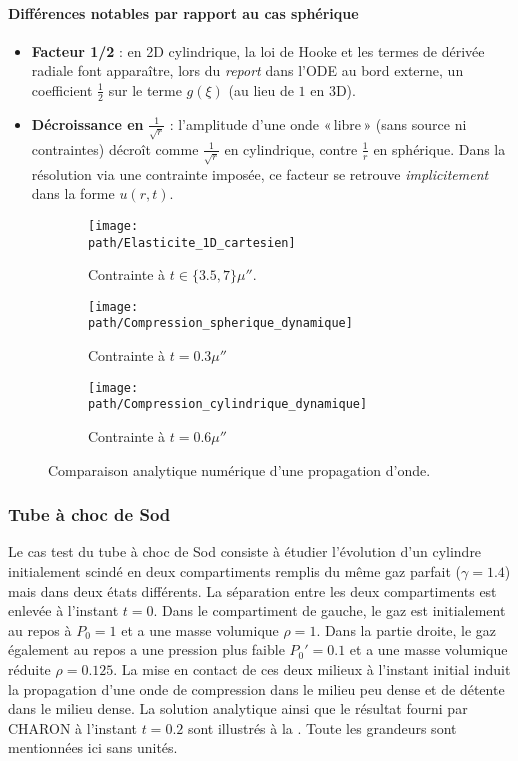 \documentclass[10pt]{book}
\def\path{./fig}
\begin{document}
\paragraph{ Différences notables par rapport au cas sphérique}
\begin{itemize}
\item \textbf{Facteur 1/2} : en 2D cylindrique, la loi de Hooke et les termes de dérivée radiale font apparaître, lors du \emph{report} dans l’ODE au bord externe, un coefficient $\tfrac12$ sur le terme $g(\xi)$ (au lieu de $1$ en 3D). 
\item \textbf{Décroissance en } $\tfrac{1}{\sqrt{r}}$ : l’amplitude d’une onde «\,libre\,» (sans source ni contraintes) décroît comme $\tfrac{1}{\sqrt{r}}$ en cylindrique, contre $\tfrac{1}{r}$ en sphérique. Dans la résolution via une contrainte imposée, ce facteur se retrouve \emph{implicitement} dans la forme $u(r,t)$.
\end{itemize}
\begin{figure}
\begin{subfigure}[b]{0.32\textwidth}
\centering \texttt{[image: \\path/Elasticite\_1D\_cartesien]}
\caption{Contrainte à $t\in\{3.5,7\}\mu\second$.}
\label{fig:Elasticite_1D_cartesien}
\end{subfigure}
\begin{subfigure}[b]{0.32\textwidth}
\centering \texttt{[image: \\path/Compression\_spherique\_dynamique]}
\caption{Contrainte à $t=0.3\mu\second$}
\label{fig:Compression_spherique_dynamique}
\end{subfigure}
\begin{subfigure}[b]{0.32\textwidth}
\centering \texttt{[image: \\path/Compression\_cylindrique\_dynamique]}
\caption{Contrainte à $t=0.6\mu\second$}
\label{fig:Compression_cylindrique_dynamique}
\end{subfigure}
\caption{Comparaison analytique numérique d'une propagation d'onde.}
\label{fig:propagation_dynamique}
\end{figure}
\subsubsection{Tube à choc de Sod}
Le cas test du tube à choc de Sod \cite{sod1978survey} consiste à étudier l'évolution d'un cylindre initialement scindé en deux compartiments remplis du même gaz parfait ($\gamma=1.4$) mais dans deux états différents. La séparation entre les deux compartiments est enlevée à l'instant $t=0$. Dans le compartiment de gauche, le gaz est initialement au repos à $P_{0}=1$ et a une masse volumique $\rho=1$. Dans la partie droite, le gaz également au repos a une pression plus faible $P_{0}'=0.1$ et a une masse volumique réduite $\rho=0.125$. La mise en contact de ces deux milieux à l'instant initial induit la propagation d'une onde de compression dans le milieu peu dense et de détente dans le milieu dense. La solution analytique ainsi que le résultat fourni par CHARON à l'instant $t=0.2$ sont illustrés à la . Toute les grandeurs sont mentionnées ici sans unités.
\end{document}

